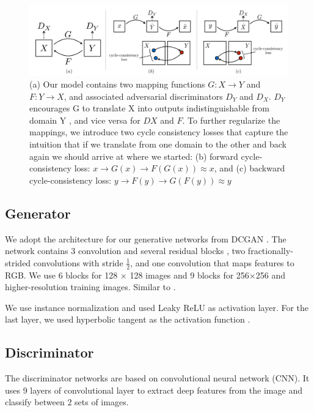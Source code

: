 \documentclass[a4paper]{article}
\begin{document}
\begin{figure}[H]
  \centering
  \includegraphics[width=1\textwidth]{cycle_cosistancy.png}
  \caption{(a) Our model contains two mapping functions $G : X → Y$ and $F : Y → X$, and associated adversarial discriminators $D_Y$ and $D_X$. $D_Y$ encourages G to translate X into outputs indistinguishable from domain Y , and vice versa for $DX$ and $F$. To further regularize the mappings, we introduce two cycle consistency losses that capture the intuition that if we translate from one domain to the other and back again we should arrive at where we started: (b) forward cycle-consistency loss: $x → G(x) → F(G(x)) ≈ x$, and (c) backward cycle-consistency loss: $y → F(y) → G(F(y)) ≈ y$}
  \label{fig:cycle_cosistancy}
\end{figure}

\subsection{Generator}
We adopt the architecture for our generative networks from DCGAN \cite{radford2016unsupervised}. The network contains 3 convolution and several residual blocks \cite{he2015deep}, two fractionally-strided convolutions with stride $\frac{1}{2}$, and one convolution that maps features to RGB. We use 6 blocks for 128 × 128 images and 9 blocks for 256×256 and higher-resolution training images. Similar to \cite{johnson2016perceptual}.

We use instance normalization \cite{ulyanov2017instance} and used Leaky ReLU \cite{xu2015empirical} as activation layer. For the last layer, we used hyperbolic tangent as the activation function \cite{6581545}.

\subsection{Discriminator}
The discriminator networks are based on convolutional neural network (CNN)\cite{8308186}. It uses 9 layers of convolutional layer to extract deep features from the image and classify between 2 sets of images.
\end{document}

